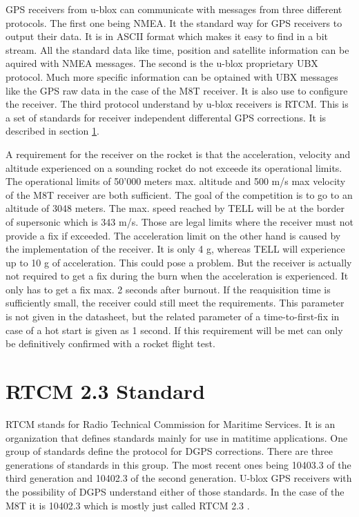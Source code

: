 GPS receivers from u-blox can communicate with messages from three different protocols.
The first one being NMEA.
It the standard way for GPS receivers to output their data.
It is in ASCII format which makes it easy to find in a bit stream.
All the standard data like time, position and satellite information can be aquired with NMEA messages.
The second is the u-blox proprietary UBX protocol.
Much more specific information can be optained with UBX messages like the GPS raw data in the case of the M8T receiver.
It is also use to configure the receiver.
The third protocol understand by u-blox receivers is RTCM.
This is a set of standards for receiver independent differental GPS corrections.
It is described in section \ref{sec:rtcm}.

A requirement for the receiver on the rocket is that the acceleration, velocity and altitude experienced on a sounding rocket do not exceede its operational limits.
The operational limits of 50'000 meters max. altitude and 500 m/s max velocity of the M8T receiver are both sufficient.
The goal of the competition is to go to an altitude of 3048 meters.
The max. speed reached by TELL will be at the border of supersonic which is 343 m/s.
Those are legal limits where the receiver must not provide a fix if exceeded.
The acceleration limit on the other hand is caused by the implementation of the receiver.
It is only 4 g, whereas TELL will experience up to 10 g of acceleration.
This could pose a problem.
But the receiver is actually not required to get a fix during the burn when the acceleration is experienced.
It only has to get a fix max. 2 seconds after burnout.
If the reaquisition time is sufficiently small, the receiver could still meet the requirements.
This parameter is not given in the datasheet, but the related parameter of a time-to-first-fix in case of a hot start is given as 1 second.
If this requirement will be met can only be definitively confirmed with a rocket flight test. \cite{M8T}


\section{RTCM 2.3 Standard}\label{sec:rtcm}

RTCM stands for Radio Technical Commission for Maritime Services.
It is an organization that defines standards mainly for use in matitime applications.
One group of standards define the protocol for DGPS corrections.
There are three generations of standards in this group.
The most recent ones being 10403.3 of the third generation and 10402.3 of the second generation.
U-blox GPS receivers with the possibility of DGPS understand either of those standards.
In the case of the M8T it is 10402.3 which is mostly just called RTCM 2.3 \cite{RTCM_2.3}.


